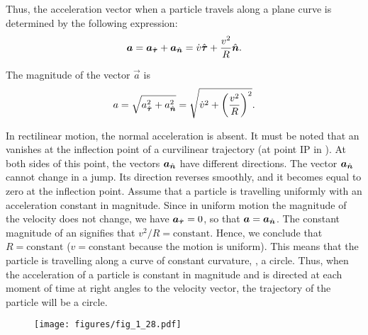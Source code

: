 Thus, the acceleration vector when a particle travels along a plane curve is determined by the following expression:
\begin{equation}\label{eq:1_91}
\boldsymbol{a} = \boldsymbol{a}_{\hat{\boldsymbol{\tau}}} + \boldsymbol{a}_{\hat{\boldsymbol{n}}} = \dot{v}\hat{\boldsymbol{\tau}} + \frac{v^2}{R}\hat{\boldsymbol{n}}.
\end{equation}

\noindent
The magnitude of the vector $\vec{a}$ is
\begin{equation}\label{eq:1_92}
a = \sqrt{a_{\hat{\boldsymbol{\tau}}}^2 + a_{\hat{\boldsymbol{n}}}^2} = \sqrt{\dot{v}^2 + \left(\frac{v^2}{R}\right)^2}.
\end{equation}

In rectilinear motion, the normal acceleration is absent. It must be noted that an vanishes at the inflection point of a curvilinear trajectory (at point IP in ). At both sides of this point, the vectors $\boldsymbol{a}_{\hat{\boldsymbol{n}}}$ have different directions. The vector $\boldsymbol{a}_{\hat{\boldsymbol{n}}}$ cannot change in a jump. Its direction reverses smoothly, and it becomes equal to zero at the inflection point. Assume that a particle is travelling uniformly with an acceleration constant in magnitude. Since in uniform motion the magnitude of the velocity does not change, we have $\boldsymbol{a}_{\hat{\boldsymbol{\tau}}}=0$, so that $\boldsymbol{a}=\boldsymbol{a}_{\hat{\boldsymbol{n}}}$. The constant magnitude of an signifies that $v^2/R=\text{constant}$. Hence, we conclude that $R=\text{constant}$ ($v=\text{constant}$ because the motion is uniform). This means that the particle is travelling along a curve of constant curvature, \ie, a circle. Thus, when the acceleration of a particle is constant in magnitude and is directed at each moment of time at right angles to the velocity vector, the trajectory of the particle will be a circle.

\begin{figure}[t]
	\begin{center}
		\texttt{[image: figures/fig\_1\_28.pdf]}
		\caption[]{}
		\label{fig:1_28}
	\end{center}
	\vspace{-0.6cm}
\end{figure}


